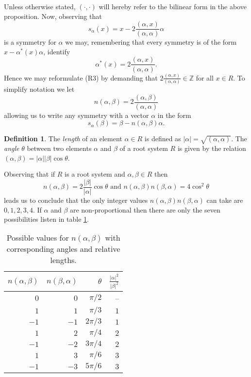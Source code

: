 \documentclass[twoside,utf8]{article}
\theoremstyle{plain}
\theoremstyle{definition}
\newtheorem{definition}{Definition}
\theoremstyle{remark}
\begin{document}
\noindent
Unless otherwise stated, $(\cdot,\cdot)$ will hereby refer to the bilinear form in the above proposition. Now, observing that
\[
s_\alpha(x)=x-2\frac{(\alpha,x)}{(\alpha,\alpha)}\alpha
\]
is a symmetry for $\alpha$ we may, remembering that every symmetry is of the form $x-\alpha^*(x)\alpha$, identify 
\[
\alpha^*(x)=2\frac{(\alpha,x)}{(\alpha,\alpha)}.
\]
Hence we may reformulate (R3) by demanding that $2\frac{(\alpha,x)}{(\alpha,\alpha)} \in \mathbb{Z}$ for all $x\in R$. To simplify notation we let
\[
n(\alpha,\beta) = 2\frac{(\alpha,\beta)}{(\alpha,\alpha)}
\]
allowing us to write any symmetry with a vector $\alpha$ in the form
\[
s_\alpha(\beta)=\beta-n(\alpha,\beta)\alpha.
\]

\begin{definition}
The \textit{length} of an element $\alpha \in R$ is defined as $|\alpha|=\sqrt{(\alpha,\alpha)}$. The \textit{angle} $\theta$ between two elements $\alpha$ and $\beta$ of a root system $R$ is given by the relation $(\alpha,\beta)=|\alpha| |\beta| \cos \theta$.
\end{definition}

\noindent
Observing that if $R$ is a root system and $\alpha,\beta \in R$ then
\[
n(\alpha,\beta) = 2\frac{|\beta|}{|\alpha|} \cos \theta
\mbox{ and }
n(\alpha,\beta)n(\beta,\alpha)=4\cos^2 \theta
\]
leads us to conclude that the only integer values $n(\alpha,\beta)n(\beta,\alpha)$ can take are $0,1,2,3,4$. If $\alpha$ and $\beta$ are non-proportional then there are only the seven possibilities listen in table \ref*{tab:RootsAndAngles}.

\begin{table}[H]
\caption{Possible values for $n(\alpha,\beta)$ with corresponding angles and relative lengths.}
\label{tab:RootsAndAngles}
\begin{center}
\begin{tabular}{r r r r}
$n(\alpha,\beta)$ 	& $n(\beta,\alpha)$ & $\theta$ 		&	$\frac{|\alpha|^2}{|\beta|^2}$			\\ \hline 
$0$ 				& $0$ 				& $\pi/2$ 		&	 -- 		\\ 
$1$ 				& $1$ 				& $\pi/3$ 		&	$1$  		\\ 
$-1$ 				& $-1$ 				& $2\pi/3$ 		&	$1$			\\ 
$1$ 				& $2$ 				& $\pi/4$ 		&	$2$	\\ 
$-1$ 				& $-2$ 				& $3\pi/4$ 		&	$2$	\\ 
$1$ 				& $3$ 				& $\pi/6$ 		&	$3$	\\ 
$-1$ 				& $-3$ 				& $5\pi/6$ 		&	$3$	\\ 
\end{tabular}
\end{center}
\end{table}
\end{document}
